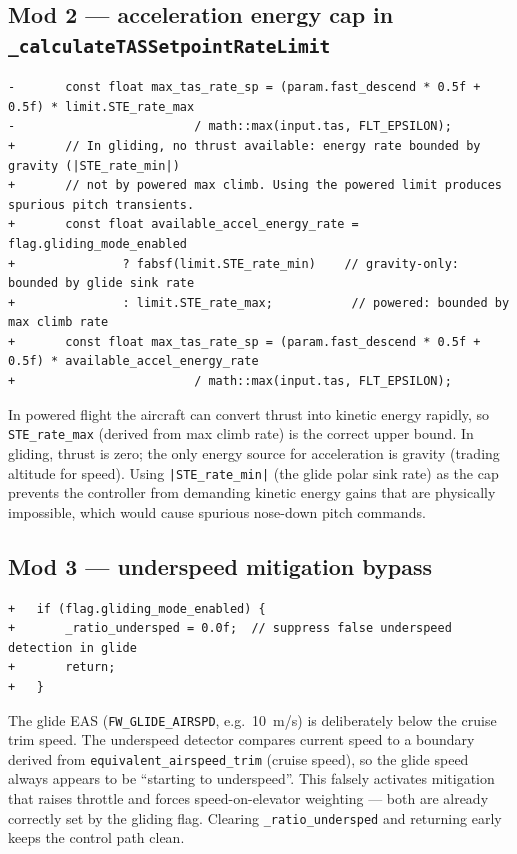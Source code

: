 \documentclass[12pt,a4paper]{article}
\begin{document}
\subsection{Mod 2 — acceleration energy cap in \texttt{\_calculateTASSetpointRateLimit}}

\begin{lstlisting}[style=diff]
-		const float max_tas_rate_sp = (param.fast_descend * 0.5f + 0.5f) * limit.STE_rate_max
-					      / math::max(input.tas, FLT_EPSILON);
+		// In gliding, no thrust available: energy rate bounded by gravity (|STE_rate_min|)
+		// not by powered max climb. Using the powered limit produces spurious pitch transients.
+		const float available_accel_energy_rate = flag.gliding_mode_enabled
+				? fabsf(limit.STE_rate_min)    // gravity-only: bounded by glide sink rate
+				: limit.STE_rate_max;           // powered: bounded by max climb rate
+		const float max_tas_rate_sp = (param.fast_descend * 0.5f + 0.5f) * available_accel_energy_rate
+					      / math::max(input.tas, FLT_EPSILON);
\end{lstlisting}
\begin{annotation}In powered flight the aircraft can convert thrust into kinetic energy rapidly, so \texttt{STE\_rate\_max} (derived from max climb rate) is the correct upper bound. In gliding, thrust is zero; the only energy source for acceleration is gravity (trading altitude for speed). Using \texttt{|STE\_rate\_min|} (the glide polar sink rate) as the cap prevents the controller from demanding kinetic energy gains that are physically impossible, which would cause spurious nose-down pitch commands.\end{annotation}

\subsection{Mod 3 — underspeed mitigation bypass}

\begin{lstlisting}[style=diff]
+	if (flag.gliding_mode_enabled) {
+		_ratio_undersped = 0.0f;  // suppress false underspeed detection in glide
+		return;
+	}
\end{lstlisting}
\begin{annotation}The glide EAS (\texttt{FW\_GLIDE\_AIRSPD}, e.g.\ 10~m/s) is deliberately below the cruise trim speed. The underspeed detector compares current speed to a boundary derived from \texttt{equivalent\_airspeed\_trim} (cruise speed), so the glide speed always appears to be ``starting to underspeed''. This falsely activates mitigation that raises throttle and forces speed-on-elevator weighting — both are already correctly set by the gliding flag. Clearing \texttt{\_ratio\_undersped} and returning early keeps the control path clean.\end{annotation}
\end{document}
